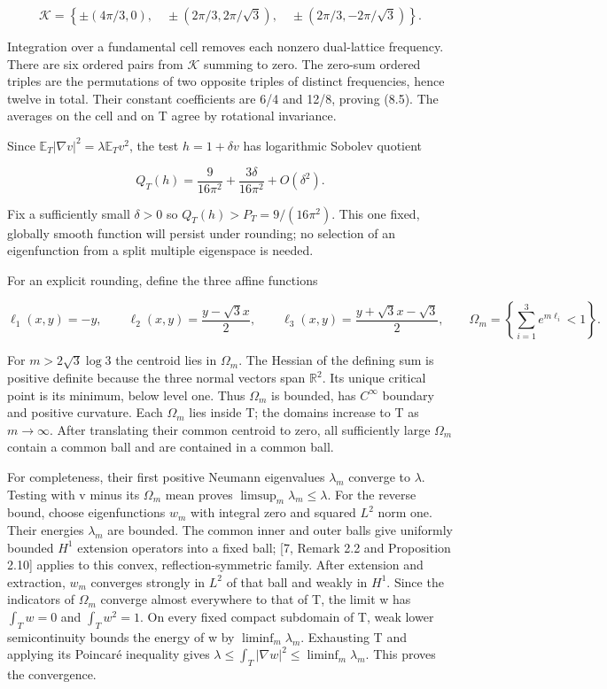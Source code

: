 \documentclass[11pt]{article}
\begin{document}
\[\mathcal K=\left\{\pm(4\pi/3,0),\quad
\pm(2\pi/3,2\pi/\sqrt3),\quad
\pm(2\pi/3,-2\pi/\sqrt3)\right\}.\tag{8.6}\]

Integration over a fundamental cell removes each nonzero dual-lattice
frequency. There are six ordered pairs from \(\mathcal{K}\) summing to
zero. The zero-sum ordered triples are the permutations of two opposite
triples of distinct frequencies, hence twelve in total. Their constant
coefficients are 6/4 and 12/8, proving (8.5). The averages on the cell
and on T agree by rotational invariance.

Since \(\mathbb E_T|\nabla v|^2=\lambda\mathbb E_Tv^2\), the test
\(h=1+\delta v\) has logarithmic Sobolev quotient

\[Q_T(h)=\frac9{16\pi^2}+\frac{3\delta}{16\pi^2}+O(\delta^2).
\tag{8.7}\]

Fix a sufficiently small \(\delta >0\) so \(Q_T(h)>P_T=9/(16\pi ^{2})\).
This one fixed, globally smooth function will persist under rounding; no
selection of an eigenfunction from a split multiple eigenspace is
needed.

For an explicit rounding, define the three affine functions

\[\ell_1(x,y)=-y,\qquad
\ell_2(x,y)=\frac{y-\sqrt3x}{2},\qquad
\ell_3(x,y)=\frac{y+\sqrt3x-\sqrt3}{2},
\qquad \Omega_m=\left\{\sum_{i=1}^3e^{m\ell_i}<1\right\}.\tag{8.8}\]

For \(m>2\sqrt{3}\log3\) the centroid lies in \(\Omega _m\). The Hessian
of the defining sum is positive definite because the three normal
vectors span \(\mathbb{R}^{2}\). Its unique critical point is its
minimum, below level one. Thus \(\Omega _m\) is bounded, has
\(C^{\infty}\) boundary and positive curvature. Each \(\Omega _m\) lies
inside T; the domains increase to T as \(m\to \infty\). After
translating their common centroid to zero, all sufficiently large
\(\Omega _m\) contain a common ball and are contained in a common ball.

For completeness, their first positive Neumann eigenvalues
\(\lambda _m\) converge to \(\lambda\). Testing with v minus its
\(\Omega _m\) mean proves \(\limsup_m\lambda_m\leq\lambda\). For the
reverse bound, choose eigenfunctions \(w_m\) with integral zero and
squared \(L^{2}\) norm one. Their energies \(\lambda _m\) are bounded.
The common inner and outer balls give uniformly bounded \(H^{1}\)
extension operators into a fixed ball; {[}7, Remark 2.2 and Proposition
2.10{]} applies to this convex, reflection-symmetric family. After
extension and extraction, \(w_m\) converges strongly in \(L^{2}\) of
that ball and weakly in \(H^{1}\). Since the indicators of \(\Omega _m\)
converge almost everywhere to that of T, the limit w has \(\int_Tw=0\)
and \(\int_Tw^2=1\). On every fixed compact subdomain of T, weak lower
semicontinuity bounds the energy of w by \(\liminf_m\lambda_m\).
Exhausting T and applying its Poincaré inequality gives
\(\lambda\leq\int_T|\nabla w|^2\leq\liminf_m\lambda_m\). This proves the
convergence.
\end{document}

